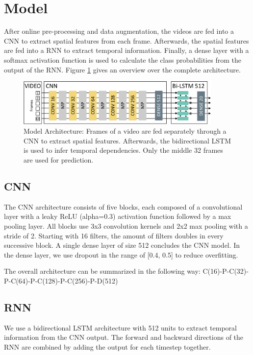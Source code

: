 \section{Model}\label{sec:model}

After online pre-processing and data augmentation, the videos are fed into a CNN to extract spatial features from each frame. Afterwards, the spatial features are fed into a RNN to extract temporal information. Finally, a dense layer with a softmax activation function is used to calculate the class probabilities from the output of the RNN. 
Figure \ref{fig:architecture} gives an overview over the complete architecture.

\begin{figure}
\includegraphics[width=0.9\textwidth]{architecture.pdf}
\caption{Model Architecture: Frames of a video are fed separately through a CNN to extract spatial features. Afterwards, the bidirectional LSTM is used to infer temporal dependencies. Only the middle 32 frames are used for prediction.}\label{fig:architecture}
\end{figure}


\subsection{CNN}

The CNN architecture consists of five blocks, each composed of a convolutional layer with a leaky ReLU (alpha=0.3) activation function followed by a max pooling layer. All blocks use 3x3 convolution kernels and 2x2 max pooling with a stride of 2. Starting with 16 filters, the amount of filters doubles in every successive block.
A single dense layer of size 512 concludes the CNN model. In the dense layer, we use dropout in the range of [0.4, 0.5] to reduce overfitting.

The overall architecture can be summarized in the following way: C(16)-P-C(32)-P-C(64)-P-C(128)-P-C(256)-P-D(512)


\subsection{RNN}

We use a bidirectional LSTM architecture with 512 units to extract temporal information from the CNN output.  The forward and backward directions of the RNN are combined by adding the output for each timestep together.

